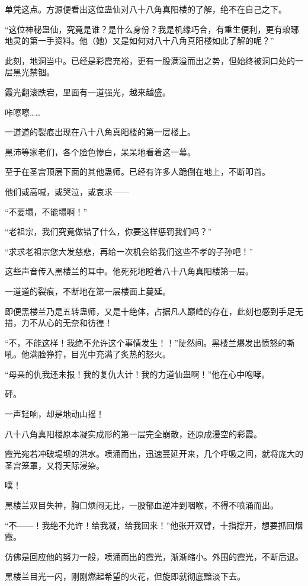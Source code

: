 \begin{this_body}
单凭这点。方源便看出这位蛊仙对八十八角真阳楼的了解，绝不在自己之下。

“这位神秘蛊仙，究竟是谁？是什么身份？我是机缘巧合，有重生便利，更有琅琊地灵的第一手资料。他（她）又是如何对八十八角真阳楼如此了解的呢？”

此刻，地洞当中。已经是彩霞充裕，更有一股满溢而出之势，但始终被洞口处的一层黑光禁锢。

霞光翻滚跌宕，里面有一道强光，越来越盛。

咔嚓嚓……

一道道的裂痕出现在八十八角真阳楼的第一层楼上。

黑沛等家老们，各个脸色惨白，呆呆地看着这一幕。

至于在圣宫顶层下面的其他蛊师。已经有许多人跪倒在地上，不断叩首。

他们或高喊，或哭泣，或哀求——

“不要塌，不能塌啊！”

“老祖宗，我们究竟做错了什么，你要这样惩罚我们吗？”

“求求老祖宗您大发慈悲，再给一次机会给我们这些不孝的子孙吧！”

这些声音传入黑楼兰的耳中。他死死地瞪着八十八角真阳楼第一层。

一道道的裂痕，不断地在第一层楼面上蔓延。

即便黑楼兰乃是五转蛊师，又是十绝体，占据凡人巅峰的存在，此刻也感到手足无措，力不从心的无奈和彷徨！

“不，不能这样！我绝不允许这个事情发生！！”陡然间。黑楼兰爆发出愤怒的嘶吼。他满脸狰狞，目光中充满了炙热的怒火。

“母亲的仇我还未报！我的复仇大计！我的力道仙蛊啊！”他在心中咆哮。

砰。

一声轻响，却是地动山摇！

八十八角真阳楼原本凝实成形的第一层完全崩散，还原成漫空的彩霞。

霞光宛若冲破堤坝的洪水。喷涌而出，迅速蔓延开来，几个呼吸之间，就将庞大的圣宫笼罩，又将天际浸染。

噗！

黑楼兰双目失神，胸口烦闷无比，一股郁血逆冲到咽喉，不得不喷涌而出。

“不——！我绝不允许！给我凝，给我回来！”他张开双臂，十指撑开，想要抓回烟霞。

仿佛是回应他的努力一般，喷涌而出的霞光，渐渐缩小。外围的霞光，不断后退。

黑楼兰目光一闪，刚刚燃起希望的火花，但旋即就彻底黯淡下去。


\end{this_body}
